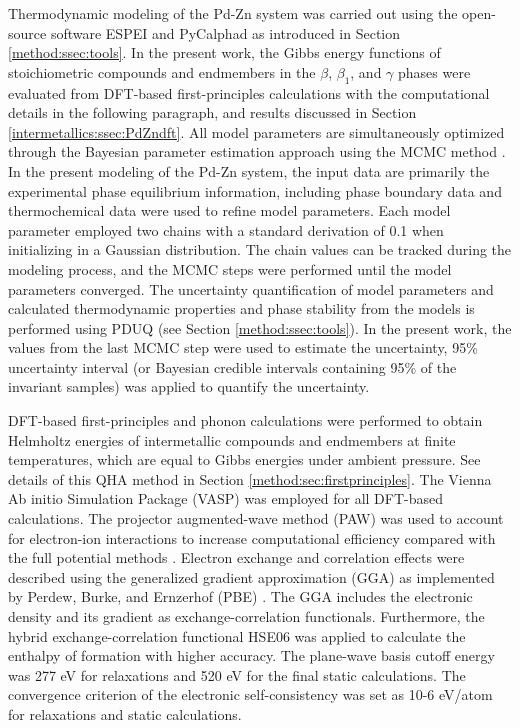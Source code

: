 Thermodynamic modeling of the Pd-Zn system was carried out using the open-source software ESPEI \cite{bocklund2019espei} and PyCalphad \cite{otis2017pycalphad} as introduced in Section \ref{method:ssec:tools}.  In the present work, the Gibbs energy functions of stoichiometric compounds and endmembers in the $\beta$, $\beta_1$, and $\gamma$ phases were evaluated from DFT-based first-principles calculations with the computational details in the following paragraph, and results discussed in Section \ref{intermetallics:ssec:PdZndft}. All model parameters are simultaneously optimized through the Bayesian parameter estimation approach using the MCMC method \cite{bocklund2019espei}. In the present modeling of the Pd-Zn system, the input data are primarily the experimental phase equilibrium information, including phase boundary data \cite{vizdal2006experimental, massalski1986binary, hansen1958constitution} and thermochemical data \cite{amore2009thermochemistry, ChiangIpserChang1977} were used to refine model parameters. Each model parameter employed two chains with a standard derivation of 0.1 when initializing in a Gaussian distribution. The chain values can be tracked during the modeling process, and the MCMC steps were performed until the model parameters converged. The uncertainty quantification of model parameters and calculated thermodynamic properties and phase stability from the models is performed using PDUQ \cite{paulson2019quantified} (see Section \ref{method:ssec:tools}). In the present work, the values from the last MCMC step were used to estimate the uncertainty, 95\% uncertainty interval (or Bayesian credible intervals containing 95\% of the invariant samples) was applied to quantify the uncertainty. 

DFT-based first-principles and phonon calculations were performed to obtain Helmholtz energies of intermetallic compounds and endmembers at finite temperatures, which are equal to Gibbs energies under ambient pressure. See details of this QHA method in Section \ref{method:sec:firstprinciples}. The Vienna Ab initio Simulation Package (VASP) \cite{kresse1996efficient} was employed for all DFT-based calculations. The projector augmented-wave method (PAW) was used to account for electron-ion interactions to increase computational efficiency compared with the full potential methods \cite{blochl1994projector, kresse1999ultrasoft}. Electron exchange and correlation effects were described using the generalized gradient approximation (GGA) as implemented by Perdew, Burke, and Ernzerhof (PBE) \cite{perdew1996generalized}. The GGA includes the electronic density and its gradient as exchange-correlation functionals. Furthermore, the hybrid exchange-correlation functional HSE06 \cite{heyd2003hybrid} was applied to calculate the enthalpy of formation with higher accuracy. The plane-wave basis cutoff energy was 277 eV for relaxations and 520 eV for the final static calculations. The convergence criterion of the electronic self-consistency was set as 10-6 eV/atom for relaxations and static calculations. 

